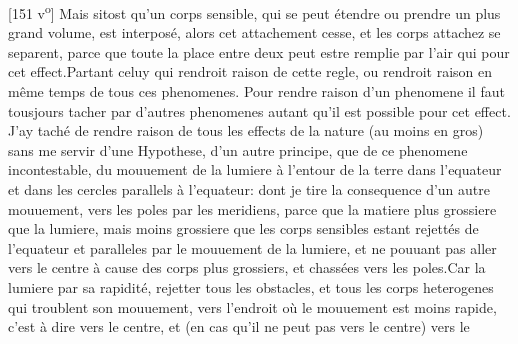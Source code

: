 [151 v\textsuperscript{o}] Mais sitost qu'un corps sensible\protect{}, qui se peut \'{e}tendre ou prendre un plus grand volume, est interpos\'{e}, alors cet attachement cesse, et les corps attachez se separent, parce que toute la place entre deux peut estre remplie par l'air qui  pour cet effect.\pend \pstart  Partant celuy qui rendroit raison de cette regle, ou  rendroit raison en même temps de tous ces phenomenes.\pend 
\pstart Pour rendre raison d'un phenomene  il faut tousjours tacher  par d'autres phenomenes  autant qu'il est possible pour cet effect. J'ay tach\'{e} de rendre raison de tous les effects de la nature (au moins en gros) sans me servir d'une Hypothese,  d'un autre principe, que de ce phenomene incontestable, du mouuement de la lumiere  \`{a} l'entour de la terre\protect{} dans l'equateur et dans les cercles parallels \`{a} l'equateur: dont je tire la consequence d'un autre mouuement, vers les poles par les meridiens, parce que la matiere plus grossiere que  la lumiere, mais moins grossiere que les corps sensibles\protect{} estant rejett\'{e}s de l'equateur et paralleles par le mouuement de la lumiere, et ne pouuant pas aller vers le centre \`{a} cause des corps plus grossiers, et chass\'{e}es vers les poles.\pend \pstart  Car la lumiere par sa rapidit\'{e},  rejetter tous les obstacles, et tous les corps heterogenes  qui troublent son mou\-uement, vers l'endroit o\`{u} le mouuement est moins rapide, c'est \`{a} dire vers le centre, et (en cas qu'il ne peut pas vers le centre) vers le \pend
